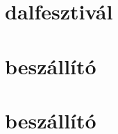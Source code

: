 \begin{spacing}{1.4}
\section*{dalfesztivál} \label{DBparegypropf1Mo}
\Mo{

}
\vspace{0.5cm}
\newpage
\section*{beszállító} \label{DBparegypropf2}
\Fa{

}
\vspace{0.5cm}
\newpage
\section*{beszállító} \label{DBparegypropf2Mo}
\Mo{

}
\vspace{0.5cm}
\newpage

\end{spacing}



